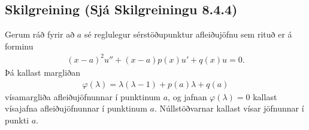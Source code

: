 \documentclass[a4paper,10pt,icelandic]{sphinxmanual}
\begin{document}
\subsection{Skilgreining (Sjá Skilgreiningu 8.4.4)}
\label{\detokenize{Kafli08:skilgreining-sja-skilgreiningu-8-4-4}}
Gerum ráð fyrir að \(a\) sé reglulegur sérstöðupunktur afleiðujöfnu sem rituð er á forminu
\begin{equation*}
\begin{split}(x-a)^2u''+(x-a)p(x)u'+q(x)u=0.\label{3.4.7}\end{split}
\end{equation*}
Þá kallast margliðan
\begin{equation*}
\begin{split}\varphi(\lambda)=\lambda(\lambda-1)+p(a)\lambda+q(a)\end{split}
\end{equation*}
vísamargliða afleiðujöfnunnar í punktinum \(a\), og jafnan \(\varphi(\lambda)=0\) kallast vísajafna afleiðujöfnunnar í punktinum \(a\). Núllstöðvarnar kallast vísar jöfnunnar í punkti \(a\).
\end{document}

